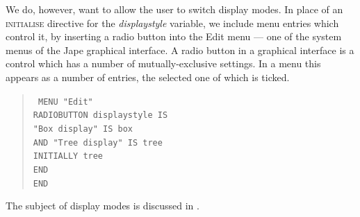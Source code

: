 We do, however, want to allow the user to switch display modes. In place of an \textsc{initialise} directive for the \textit{displaystyle} variable, we include menu entries which control it, by inserting a radio button into the Edit menu --- one of the system menus of the Jape graphical interface. A radio button in a graphical interface is a control which has a number of mutually-exclusive settings. In a menu this appears as a number of entries, the selected one of which is ticked.
\begin{quote}\tt\small
MENU "Edit"\\
\tab RADIOBUTTON displaystyle IS\\
\tab \tab \tab "Box display"   IS box\\
\tab AND "Tree display"  IS tree\\
\tab INITIALLY tree\\
\tab END\\
END
\end{quote}
The subject of display modes is discussed in .


